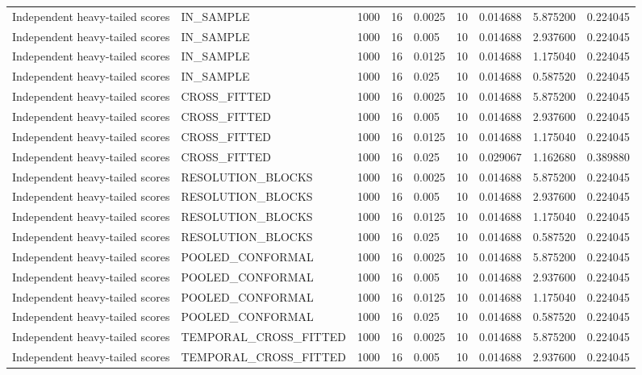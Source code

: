 \begin{tabular}{lllllllll}
Independent heavy-tailed scores & IN\_SAMPLE & 1000 & 16 & 0.0025 & 10 & 0.014688 & 5.875200 & 0.224045 \\
Independent heavy-tailed scores & IN\_SAMPLE & 1000 & 16 & 0.005 & 10 & 0.014688 & 2.937600 & 0.224045 \\
Independent heavy-tailed scores & IN\_SAMPLE & 1000 & 16 & 0.0125 & 10 & 0.014688 & 1.175040 & 0.224045 \\
Independent heavy-tailed scores & IN\_SAMPLE & 1000 & 16 & 0.025 & 10 & 0.014688 & 0.587520 & 0.224045 \\
Independent heavy-tailed scores & CROSS\_FITTED & 1000 & 16 & 0.0025 & 10 & 0.014688 & 5.875200 & 0.224045 \\
Independent heavy-tailed scores & CROSS\_FITTED & 1000 & 16 & 0.005 & 10 & 0.014688 & 2.937600 & 0.224045 \\
Independent heavy-tailed scores & CROSS\_FITTED & 1000 & 16 & 0.0125 & 10 & 0.014688 & 1.175040 & 0.224045 \\
Independent heavy-tailed scores & CROSS\_FITTED & 1000 & 16 & 0.025 & 10 & 0.029067 & 1.162680 & 0.389880 \\
Independent heavy-tailed scores & RESOLUTION\_BLOCKS & 1000 & 16 & 0.0025 & 10 & 0.014688 & 5.875200 & 0.224045 \\
Independent heavy-tailed scores & RESOLUTION\_BLOCKS & 1000 & 16 & 0.005 & 10 & 0.014688 & 2.937600 & 0.224045 \\
Independent heavy-tailed scores & RESOLUTION\_BLOCKS & 1000 & 16 & 0.0125 & 10 & 0.014688 & 1.175040 & 0.224045 \\
Independent heavy-tailed scores & RESOLUTION\_BLOCKS & 1000 & 16 & 0.025 & 10 & 0.014688 & 0.587520 & 0.224045 \\
Independent heavy-tailed scores & POOLED\_CONFORMAL & 1000 & 16 & 0.0025 & 10 & 0.014688 & 5.875200 & 0.224045 \\
Independent heavy-tailed scores & POOLED\_CONFORMAL & 1000 & 16 & 0.005 & 10 & 0.014688 & 2.937600 & 0.224045 \\
Independent heavy-tailed scores & POOLED\_CONFORMAL & 1000 & 16 & 0.0125 & 10 & 0.014688 & 1.175040 & 0.224045 \\
Independent heavy-tailed scores & POOLED\_CONFORMAL & 1000 & 16 & 0.025 & 10 & 0.014688 & 0.587520 & 0.224045 \\
Independent heavy-tailed scores & TEMPORAL\_CROSS\_FITTED & 1000 & 16 & 0.0025 & 10 & 0.014688 & 5.875200 & 0.224045 \\
Independent heavy-tailed scores & TEMPORAL\_CROSS\_FITTED & 1000 & 16 & 0.005 & 10 & 0.014688 & 2.937600 & 0.224045 \\

\end{tabular}
